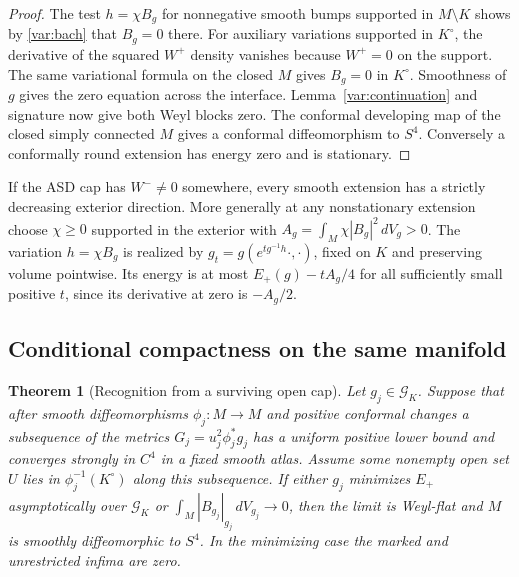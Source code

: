 \documentclass[11pt]{article}
\numberwithin{equation}{section}
\newtheorem{theorem}{Theorem}[section]
\theoremstyle{definition}
\theoremstyle{remark}
\begin{document}
\begin{proof}
The test \(h=\chi B_g\) for nonnegative smooth bumps supported in
\(M\setminus K\) shows by \eqref{var:bach} that \(B_g=0\) there.
For auxiliary variations supported in \(K^\circ\), the derivative
of the squared \(W^+\) density vanishes because \(W^+=0\) on the
support. The same variational formula on the closed \(M\) gives
\(B_g=0\) in \(K^\circ\). Smoothness of \(g\) gives the zero
equation across the interface. Lemma~\ref{var:continuation}
and signature now give both Weyl blocks zero. The conformal
developing map of the closed simply connected \(M\) gives a
conformal diffeomorphism to \(S^4\). Conversely a conformally
round extension has energy zero and is stationary.
\end{proof}

If the ASD cap has \(W^-\ne0\) somewhere, every smooth extension
has a strictly decreasing exterior direction. More generally
at any nonstationary extension choose \(\chi\ge0\) supported
in the exterior with \(A_g=\int_M\chi|B_g|^2\,dV_g>0\).
The variation \(h=\chi B_g\) is realized by
\(g_t=g(e^{t g^{-1}h}\cdot,\cdot)\), fixed on \(K\) and
preserving volume pointwise. Its energy is at most
\(E_+(g)-tA_g/4\) for all sufficiently small positive \(t\), since
its derivative at zero is \(-A_g/2\).

\subsection{Conditional compactness on the same manifold}

\begin{theorem}[Recognition from a surviving open cap]\label{var:compactness}
Let \(g_j\in\mathcal G_K\). Suppose that after smooth
diffeomorphisms \(\phi_j:M\to M\) and positive conformal changes
a subsequence of the metrics \(G_j=u_j^2\phi_j^*g_j\) has a uniform
positive lower bound and converges strongly in \(C^4\) in a fixed smooth atlas.
Assume some nonempty open set \(U\) lies in
\(\phi_j^{-1}(K^\circ)\) along this subsequence.
If either \(g_j\) minimizes \(E_+\) asymptotically over
\(\mathcal G_K\) or \(\int_M |B_{g_j}|_{g_j}\,dV_{g_j}\to0\), then
the limit is Weyl-flat and \(M\) is smoothly diffeomorphic to
\(S^4\). In the minimizing case the marked and unrestricted infima are zero.
\end{theorem}
\end{document}
